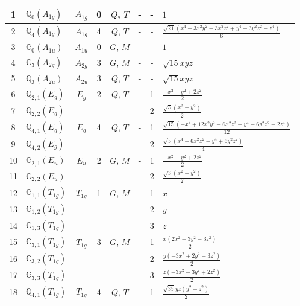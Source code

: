 \documentclass[fleqn,10pt,landscape]{jsarticle}
\begin{document}
\begin{longtable}[l]{clcccccl}
1 & $\mathbb{Q}_{0}(A_{1g})$ & $A_{1g}$ & 0 & $Q$, $T$ & - & - & $1$ \\ \hline
2 & $\mathbb{Q}_{4}(A_{1g})$ & $A_{1g}$ & 4 & $Q$, $T$ & - & - & $\frac{\sqrt{21} \left(x^{4} - 3 x^{2} y^{2} - 3 x^{2} z^{2} + y^{4} - 3 y^{2} z^{2} + z^{4}\right)}{6}$ \\ \hline
3 & $\mathbb{G}_{0}(A_{1u})$ & $A_{1u}$ & 0 & $G$, $M$ & - & - & $1$ \\ \hline
4 & $\mathbb{G}_{3}(A_{2g})$ & $A_{2g}$ & 3 & $G$, $M$ & - & - & $\sqrt{15} x y z$ \\ \hline
5 & $\mathbb{Q}_{3}(A_{2u})$ & $A_{2u}$ & 3 & $Q$, $T$ & - & - & $\sqrt{15} x y z$ \\ \hline
6 & $\mathbb{Q}_{2,1}(E_{g})$ & $E_{g}$ & 2 & $Q$, $T$ & - & 1 & $\frac{- x^{2} - y^{2} + 2 z^{2}}{2}$ \\
7 & $\mathbb{Q}_{2,2}(E_{g})$ &  &  &  &  & 2 & $\frac{\sqrt{3} \left(x^{2} - y^{2}\right)}{2}$ \\ \hline
8 & $\mathbb{Q}_{4,1}(E_{g})$ & $E_{g}$ & 4 & $Q$, $T$ & - & 1 & $\frac{\sqrt{15} \left(- x^{4} + 12 x^{2} y^{2} - 6 x^{2} z^{2} - y^{4} - 6 y^{2} z^{2} + 2 z^{4}\right)}{12}$ \\
9 & $\mathbb{Q}_{4,2}(E_{g})$ &  &  &  &  & 2 & $\frac{\sqrt{5} \left(x^{4} - 6 x^{2} z^{2} - y^{4} + 6 y^{2} z^{2}\right)}{4}$ \\ \hline
10 & $\mathbb{G}_{2,1}(E_{u})$ & $E_{u}$ & 2 & $G$, $M$ & - & 1 & $\frac{- x^{2} - y^{2} + 2 z^{2}}{2}$ \\
11 & $\mathbb{G}_{2,2}(E_{u})$ &  &  &  &  & 2 & $\frac{\sqrt{3} \left(x^{2} - y^{2}\right)}{2}$ \\ \hline
12 & $\mathbb{G}_{1,1}(T_{1g})$ & $T_{1g}$ & 1 & $G$, $M$ & - & 1 & $x$ \\
13 & $\mathbb{G}_{1,2}(T_{1g})$ &  &  &  &  & 2 & $y$ \\
14 & $\mathbb{G}_{1,3}(T_{1g})$ &  &  &  &  & 3 & $z$ \\ \hline
15 & $\mathbb{G}_{3,1}(T_{1g})$ & $T_{1g}$ & 3 & $G$, $M$ & - & 1 & $\frac{x \left(2 x^{2} - 3 y^{2} - 3 z^{2}\right)}{2}$ \\
16 & $\mathbb{G}_{3,2}(T_{1g})$ &  &  &  &  & 2 & $\frac{y \left(- 3 x^{2} + 2 y^{2} - 3 z^{2}\right)}{2}$ \\
17 & $\mathbb{G}_{3,3}(T_{1g})$ &  &  &  &  & 3 & $\frac{z \left(- 3 x^{2} - 3 y^{2} + 2 z^{2}\right)}{2}$ \\ \hline
18 & $\mathbb{Q}_{4,1}(T_{1g})$ & $T_{1g}$ & 4 & $Q$, $T$ & - & 1 & $\frac{\sqrt{35} y z \left(y^{2} - z^{2}\right)}{2}$ \\

\end{longtable}
\end{document}
